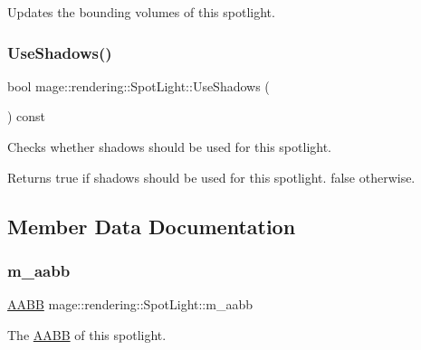 Updates the bounding volumes of this spotlight. \hypertarget{classmage_1_1rendering_1_1_spot_light_a5081e3b99bd869d6c241b48666917cd4}{}\label{classmage_1_1rendering_1_1_spot_light_a5081e3b99bd869d6c241b48666917cd4} 
\subsubsection{\texorpdfstring{Use\+Shadows()}{UseShadows()}}
{\footnotesize\ttfamily bool mage\+::rendering\+::\+Spot\+Light\+::\+Use\+Shadows (\begin{DoxyParamCaption}{ }\end{DoxyParamCaption}) const\hspace{0.3cm}{\ttfamily [noexcept]}}

Checks whether shadows should be used for this spotlight.

\begin{DoxyReturn}{Returns}
{\ttfamily true} if shadows should be used for this spotlight. {\ttfamily false} otherwise. 
\end{DoxyReturn}


\subsection{Member Data Documentation}
\hypertarget{classmage_1_1rendering_1_1_spot_light_a8d79d322ce7d394d4de201478350d795}{}\label{classmage_1_1rendering_1_1_spot_light_a8d79d322ce7d394d4de201478350d795} 
\subsubsection{\texorpdfstring{m\+\_\+aabb}{m\_aabb}}
{\footnotesize\ttfamily \hyperlink{classmage_1_1_a_a_b_b}{A\+A\+BB} mage\+::rendering\+::\+Spot\+Light\+::m\+\_\+aabb\hspace{0.3cm}{\ttfamily [private]}}

The \hyperlink{classmage_1_1_a_a_b_b}{A\+A\+BB} of this spotlight. \hypertarget{classmage_1_1rendering_1_1_spot_light_acb8679b0c2baaec69aadc9f2c021b188}{}\label{classmage_1_1rendering_1_1_spot_light_acb8679b0c2baaec69aadc9f2c021b188} 
